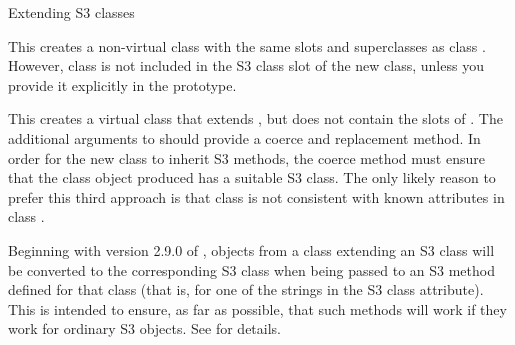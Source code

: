 \begin{Section}{Extending S3 classes}

This creates a non-virtual class with the same slots and superclasses
as class .  However, class  is not included in
the S3 class slot of the new class, unless you provide it explicitly
in the prototype.


This creates a virtual class that extends , but does not
contain the slots of .  The additional arguments to
 should provide a coerce and replacement method.
In order for the new class to inherit S3 methods, the coerce method must
ensure that the class  object produced has a suitable S3
class.  The only likely reason to prefer this third approach is that
class  is not consistent with known attributes in class
.

Beginning with version 2.9.0 of \R{}, objects from a class extending an
S3 class will be converted to the corresponding S3 class when being
passed to an S3 method defined for that class (that is, for one of the
strings in the S3 class attribute).  This is intended to ensure, as
far as possible, that such methods will work if they work for ordinary
S3 objects.  See  for details.
\end{Section}
%
